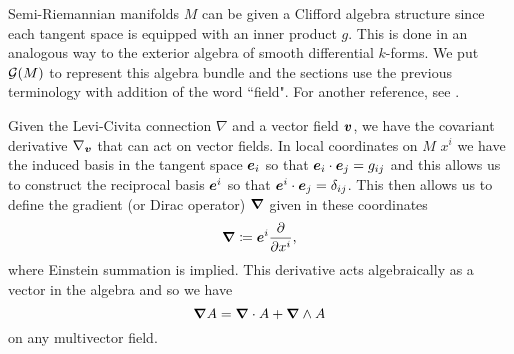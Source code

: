 \documentclass[conf]{new-aiaa}
\begin{document}
Semi-Riemannian manifolds $M$ can be given a Clifford algebra structure since each tangent space is equipped with an inner product $g$. This is done in an analogous way to the exterior algebra of smooth differential $k$-forms. We put $\mathcal{G}(M)$ to represent this algebra bundle and the sections use the previous terminology with addition of the word ``field". For another reference, see \cite{schindler_geometric_2020}. 

Given the Levi-Civita connection $\nabla$ and a vector field $\boldsymbol{v}$, we have the covariant derivative $\nabla_{\boldsymbol{v}}$ that can act on vector fields. In local coordinates on $M$ $x^i$ we have the induced basis in the tangent space $\boldsymbol{e}_i$ so that $\boldsymbol{e}_i\cdot \boldsymbol{e}_j = g_{ij}$ and this allows us to construct the reciprocal basis $\boldsymbol{e}^i$ so that $\boldsymbol{e}^i\cdot \boldsymbol{e}_j = \delta_{ij}$. This then allows us to define the gradient (or Dirac operator) $\boldsymbol{\nabla}$ given in these coordinates
\begin{equation}
    \boldsymbol{\nabla} \coloneqq \boldsymbol{e}^i \frac{\partial}{\partial x^i},
\end{equation}
where Einstein summation is implied. This derivative acts algebraically as a vector in the algebra and so we have
\begin{equation}
\boldsymbol{\nabla} A = \boldsymbol{\nabla} \cdot A + \boldsymbol{\nabla} \wedge A
\end{equation}
on any multivector field. 
\end{document}
